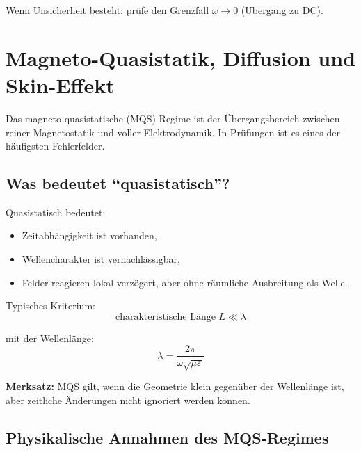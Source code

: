 \documentclass[a4paper]{article}
\newcommand{\imp}[1]{{\color{accent}\bfseries #1}}
\newcommand{\eps}{\varepsilon}
\begin{document}
\begin{taktik}
Wenn Unsicherheit besteht:
prüfe den Grenzfall $\omega\to 0$ (Übergang zu DC).
\end{taktik}
\section{Magneto-Quasistatik, Diffusion und Skin-Effekt}

\begin{merke}
Das magneto-quasistatische (MQS) Regime ist der Übergangsbereich
zwischen reiner Magnetostatik und voller Elektrodynamik.
In Prüfungen ist es eines der häufigsten Fehlerfelder.
\end{merke}

\subsection{Was bedeutet ``quasistatisch''?}

Quasistatisch bedeutet:
\begin{itemize}
  \item Zeitabhängigkeit ist vorhanden,
  \item Wellencharakter ist vernachlässigbar,
  \item Felder reagieren lokal verzögert, aber ohne räumliche Ausbreitung als Welle.
\end{itemize}

Typisches Kriterium:
\[
\text{charakteristische Länge } L \ll \lambda
\]

mit der Wellenlänge:
\[
\lambda = \frac{2\pi}{\omega\sqrt{\mu\eps}}
\]

\begin{schema}
\imp{Merksatz:}
MQS gilt, wenn die Geometrie klein gegenüber der Wellenlänge ist,
aber zeitliche Änderungen nicht ignoriert werden können.
\end{schema}

\subsection{Physikalische Annahmen des MQS-Regimes}
\end{document}
